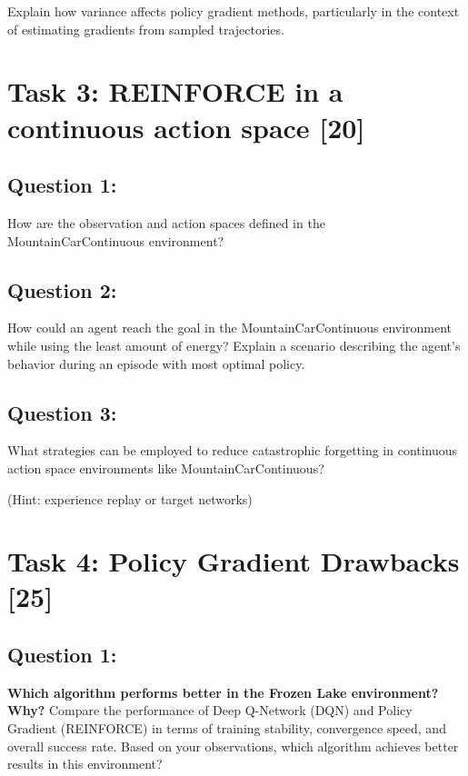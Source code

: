 \documentclass[12pt]{article}
\begin{document}
{{{Explain how variance affects policy gradient methods, particularly in the context of estimating gradients from sampled trajectories.

\newpage

\section{Task 3: REINFORCE in a continuous action space [20]}

\subsection{Question 1:}

How are the observation and action spaces defined in the MountainCarContinuous environment?
\vspace*{0.3cm}

\subsection{Question 2:}

How could an agent reach the goal in the MountainCarContinuous environment while using the least amount of energy? Explain a scenario describing the agent's behavior during an episode with most optimal policy.
\vspace*{0.3cm}

\subsection{Question 3:}

What strategies can be employed to reduce catastrophic forgetting in continuous action space environments like MountainCarContinuous?

(Hint: experience replay or target networks)
\vspace*{0.3cm}

\newpage

\section{Task 4: Policy Gradient Drawbacks [25]}

\subsection{Question 1:}
\textbf{Which algorithm performs better in the Frozen Lake environment? Why?}
\newline
Compare the performance of Deep Q-Network (DQN) and Policy Gradient (REINFORCE) in terms of training stability, convergence speed, and overall success rate. Based on your observations, which algorithm achieves better results in this environment?

}}}
\end{document}
